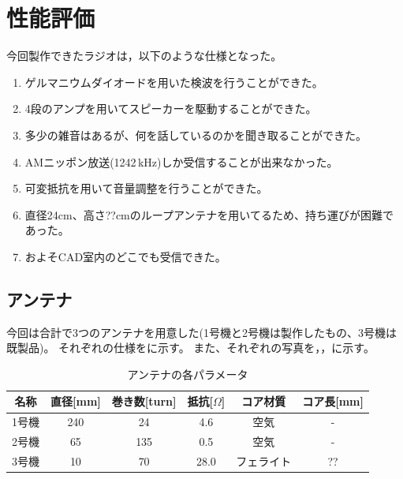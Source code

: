 \documentclass[report.tex]{subfiles}
\begin{document}
\section{性能評価}

今回製作できたラジオは，以下のような仕様となった。

\begin{enumerate}
	\item ゲルマニウムダイオードを用いた検波を行うことができた。
	\item 4段のアンプを用いてスピーカーを駆動することができた。
	\item 多少の雑音はあるが、何を話しているのかを聞き取ることができた。
	\item AMニッポン放送(1242\,kHz)しか受信することが出来なかった。
	\item 可変抵抗を用いて音量調整を行うことができた。
	\item 直径24cm、高さ??cmのループアンテナを用いてるため、持ち運びが困難であった。
	\item およそCAD室内のどこでも受信できた。
\end{enumerate}

\subsection{アンテナ}

今回は合計で3つのアンテナを用意した(1号機と2号機は製作したもの、3号機は既製品)。
それぞれの仕様をに示す。
また、それぞれの写真を，，に示す。

\begin{table}[h]
	\centering
	\caption{アンテナの各パラメータ}
	\label{tab:ant}
	\begin{tabular}{cccccc} \hline
		名称  & 直径[mm] & 巻き数[turn] & 抵抗[\(\Omega\)] & コア材質  & コア長[mm] \\ \hline
		1号機 & 240    & 24        & 4.6            & 空気    & -       \\
		2号機 & 65     & 135       & 0.5            & 空気    & -       \\
		3号機 & 10     & 70        & 28.0           & フェライト & ??      \\ \hline
	\end{tabular}
\end{table}
\end{document}
